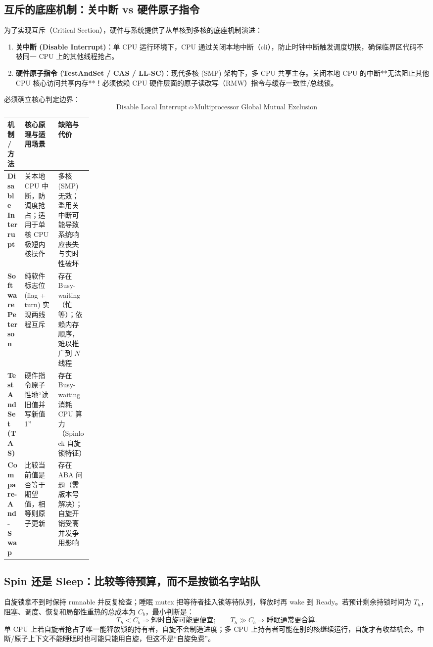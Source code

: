 \documentclass[11pt,a4paper]{ctexart}
\newcommand{\kw}[1]{\textbf{#1}}
\begin{document}
\subsection{互斥的底座机制：关中断 vs 硬件原子指令}

为了实现互斥（Critical Section），硬件与系统提供了从单核到多核的底座机制演进：

\begin{enumerate}
  \item \kw{关中断 (Disable Interrupt)}：单 CPU 运行环境下，CPU 通过关闭本地中断（cli），防止时钟中断触发调度切换，确保临界区代码不被同一 CPU 上的其他线程抢占。
  \item \kw{硬件原子指令 (TestAndSet / CAS / LL-SC)}：现代多核 (SMP) 架构下，多 CPU 共享主存。关闭本地 CPU 的中断**无法阻止其他 CPU 核心访问共享内存**！必须依赖 CPU 硬件层面的原子读改写（RMW）指令与缓存一致性/总线锁。
\end{enumerate}

必须确立核心判定边界：
\[
\boxed{
\text{Disable Local Interrupt}
\not\Rightarrow
\text{Multiprocessor Global Mutual Exclusion}
}
\]

\begingroup
\small
\renewcommand{\arraystretch}{1.25}
\setlength{\tabcolsep}{4pt}
\begin{tabularx}{\linewidth}{>{\bfseries}p{0.20\linewidth} X X}
\toprule
机制 / 方法 & 核心原理与适用场景 & 缺陷与代价\\
\midrule
Disable Interrupt & 关本地 CPU 中断，防调度抢占；适用于单核 CPU 极短内核操作 & 多核 (SMP) 无效；滥用关中断可能导致系统响应丧失与实时性破坏\\
Software Peterson & 纯软件标志位 (flag + turn) 实现两线程互斥 & 存在 Busy-waiting（忙等）；依赖内存顺序，难以推广到 $N$ 线程\\
TestAndSet (TAS) & 硬件指令原子性地“读旧值并写新值 1” & 存在 Busy-waiting 消耗 CPU 算力（Spinlock 自旋锁特征）\\
Compare-And-Swap & 比较当前值是否等于期望值，相等则原子更新 & 存在 ABA 问题（需版本号解决）；自旋开销受高并发争用影响\\
\bottomrule
\end{tabularx}
\endgroup

\subsection{Spin 还是 Sleep：比较等待预算，而不是按锁名字站队}

自旋锁拿不到时保持 runnable 并反复检查；睡眠 mutex 把等待者挂入锁等待队列，释放时再 wake 到 Ready。若预计剩余持锁时间为 $T_h$，阻塞、调度、恢复和局部性重热的总成本为 $C_b$，最小判断是：
\[
\boxed{T_h<C_b\Rightarrow\text{短时自旋可能更便宜};\qquad
T_h\gg C_b\Rightarrow\text{睡眠通常更合算}.}
\]
单 CPU 上若自旋者抢占了唯一能释放锁的持有者，自旋不会制造进度；多 CPU 上持有者可能在别的核继续运行，自旋才有收益机会。中断/原子上下文不能睡眠时也可能只能用自旋，但这不是“自旋免费”。
\end{document}
